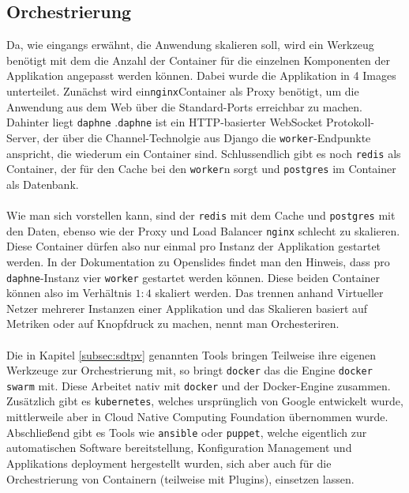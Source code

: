 \documentclass[a4paper]{article}
\begin{document}
\subsection{Orchestrierung} \label{subsec:sdtorch}
Da, wie eingangs erwähnt, die Anwendung skalieren soll, wird ein Werkzeug 
benötigt mit dem die Anzahl der Container für die einzelnen Komponenten 
der Applikation angepasst werden können. Dabei wurde die Applikation in 4 
Images unterteilet. Zunächst wird ein\texttt{nginx}\cite{nginx}Container als 
\glqq{}Proxy\grqq{} benötigt, um die Anwendung aus dem Web über die 
Standard-Ports erreichbar zu machen. Dahinter liegt \texttt{daphne} 
\cite{daphne}.\texttt{daphne} ist ein HTTP-basierter WebSocket 
Protokoll-Server, der über die Channel-Technolgie aus Django die 
\texttt{worker}-Endpunkte anspricht, die wiederum ein Container sind. 
Schlussendlich gibt es noch \texttt{redis}\cite{reids} als Container, 
der für den Cache bei den \texttt{worker}n sorgt und 
\texttt{postgres}\cite{postgres} im Container als Datenbank.\\
\\
Wie man sich vorstellen kann, sind der \texttt{redis} mit dem Cache und 
\texttt{postgres} mit den Daten, ebenso wie der Proxy und Load Balancer 
\texttt{nginx} schlecht zu skalieren. Diese Container dürfen also 
nur einmal pro Instanz der Applikation gestartet werden. In der Dokumentation 
zu Openslides\cite{osgh} findet man den Hinweis, dass pro 
\texttt{daphne}-Instanz vier \texttt{worker} gestartet werden können. Diese 
beiden Container können also im Verhältnis $1:4$ skaliert werden. Das trennen 
anhand Virtueller Netzer mehrerer Instanzen einer Applikation und das Skalieren 
basiert auf Metriken oder auf \glqq{}Knopfdruck\grqq{} zu machen, nennt man 
Orchesteriren.\\
\\
Die in Kapitel \ref{subsec:sdtpv} genannten Tools bringen Teilweise ihre 
eigenen Werkzeuge zur Orchestrierung mit, so bringt \texttt{docker} das die 
Engine \texttt{docker swarm}\cite{dockSwarm} mit. Diese Arbeitet nativ mit 
\texttt{docker} und der Docker-Engine zusammen. Zusätzlich gibt es 
\texttt{kubernetes}\cite{kubernetes}, welches ursprünglich von Google 
entwickelt wurde, mittlerweile aber in Cloud Native Computing Foundation 
übernommen wurde. Abschließend gibt es Tools wie \texttt{ansible}\cite{ansible} 
oder \texttt{puppet}\cite{puppet}, welche eigentlich zur automatischen Software 
bereitstellung, Konfiguration Management und Applikations deployment 
hergestellt wurden, sich aber auch für die Orchestrierung von Containern 
(teilweise mit Plugins), einsetzen lassen.
\end{document}
